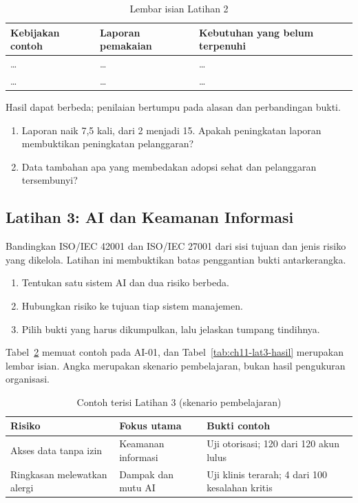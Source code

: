\begin{table}[!htb]
  \centering\small
  \caption{Lembar isian Latihan 2}\label{tab:ch11-lat2-hasil}
  \begin{tabularx}{\textwidth}{|>{\raggedright\arraybackslash}X|>{\raggedright\arraybackslash}X|>{\raggedright\arraybackslash}X|}
    \hline
    \textbf{Kebijakan contoh} & \textbf{Laporan pemakaian} & \textbf{Kebutuhan yang belum terpenuhi}
    \\ \hline
    \dots & \dots & \dots \\ \hline
    \dots & \dots & \dots \\ \hline
  \end{tabularx}
\end{table}

Hasil dapat berbeda; penilaian bertumpu pada alasan dan perbandingan bukti.
\begin{enumerate}
  \item Laporan naik 7,5 kali, dari 2 menjadi 15. Apakah peningkatan laporan membuktikan peningkatan
  pelanggaran?
  \item Data tambahan apa yang membedakan adopsi sehat dan pelanggaran tersembunyi?
\end{enumerate}

\subsection*{Latihan 3: AI dan Keamanan Informasi}

Bandingkan ISO/IEC 42001 dan ISO/IEC 27001 dari sisi tujuan dan jenis risiko yang dikelola. Latihan
ini membuktikan batas penggantian bukti antarkerangka.

\begin{enumerate}
  \item Tentukan satu sistem AI dan dua risiko berbeda.
  \item Hubungkan risiko ke tujuan tiap sistem manajemen.
  \item Pilih bukti yang harus dikumpulkan, lalu jelaskan tumpang tindihnya.
\end{enumerate}

Tabel~\ref{tab:ch11-lat3-contoh} memuat contoh pada AI-01, dan Tabel~\ref{tab:ch11-lat3-hasil}
merupakan lembar isian. Angka merupakan skenario pembelajaran, bukan hasil pengukuran organisasi.

\begin{table}[!htb]
  \centering\small
  \caption{Contoh terisi Latihan 3 (skenario pembelajaran)}\label{tab:ch11-lat3-contoh}
  \begin{tabularx}{\textwidth}{|>{\raggedright\arraybackslash}X|>{\raggedright\arraybackslash}X|>{\raggedright\arraybackslash}X|}
    \hline
    \textbf{Risiko} & \textbf{Fokus utama} & \textbf{Bukti contoh} \\ \hline
    Akses data tanpa izin & Keamanan informasi & Uji otorisasi; 120 dari 120 akun lulus \\ \hline
    Ringkasan melewatkan alergi & Dampak dan mutu AI & Uji klinis terarah; 4 dari 100 kesalahan
    kritis \\ \hline
  \end{tabularx}
\end{table}

